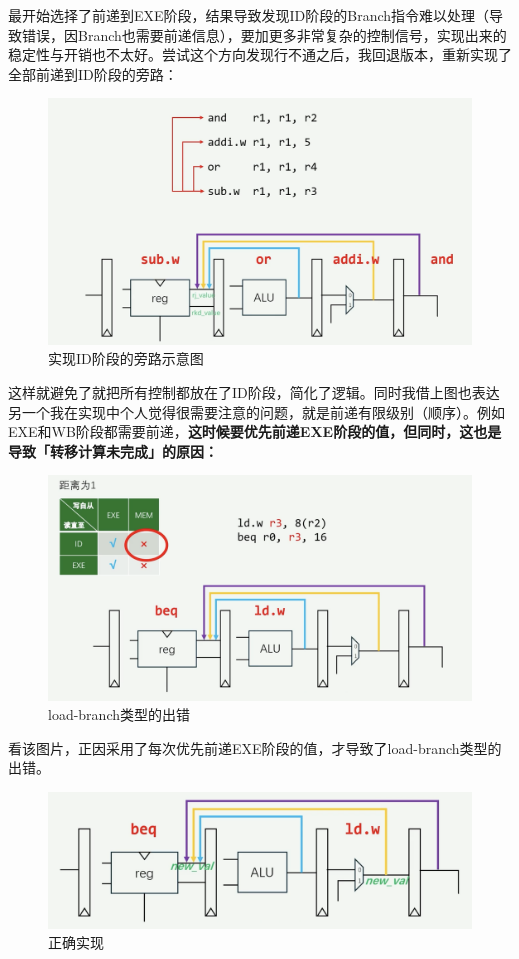 \documentclass[a4paper]{article}
\begin{document}
最开始选择了前递到EXE阶段，结果导致发现ID阶段的Branch指令难以处理（导致错误，因Branch也需要前递信息），要加更多非常复杂的控制信号，实现出来的稳定性与开销也不太好。尝试这个方向发现行不通之后，我回退版本，重新实现了全部前递到ID阶段的旁路：

\begin{figure}[H]
    \centering
    \includegraphics[width=0.8\linewidth]{img/顺序图片/顺序1.png}
    \caption{实现ID阶段的旁路示意图}
\end{figure}

这样就避免了就把所有控制都放在了ID阶段，简化了逻辑。同时我借上图也表达另一个我在实现中个人觉得很需要注意的问题，就是前递有限级别（顺序）。例如EXE和WB阶段都需要前递，\textbf{这时候要优先前递EXE阶段的值，但同时，这也是导致「转移计算未完成」的原因：}


\begin{figure}[H]
    \centering
    \includegraphics[width=0.8\linewidth]{img/顺序图片/需要阻塞情况1.png}
    \caption{load-branch类型的出错}
\end{figure}

看该图片，正因采用了每次优先前递EXE阶段的值，才导致了load-branch类型的出错。

\begin{figure}[H]
    \centering
    \includegraphics[width=0.8\linewidth]{img/顺序图片/需要阻塞情况2.png}
    \caption{正确实现}
\end{figure}
\end{document}
